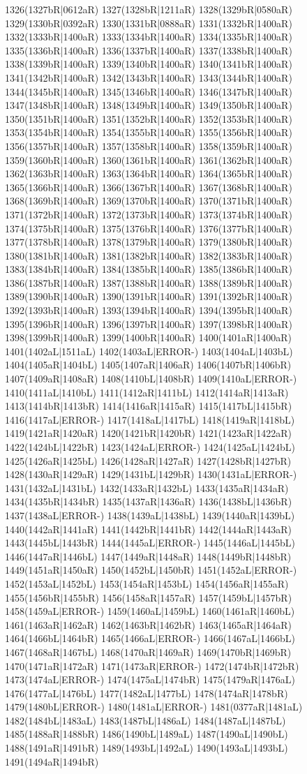 1326(1327bR|0612aR) 1327(1328bR|1211aR) 1328(1329bR|0580aR) 1329(1330bR|0392aR) 1330(1331bR|0888aR) 1331(1332bR|1400aR) 1332(1333bR|1400aR) 1333(1334bR|1400aR) 1334(1335bR|1400aR) 1335(1336bR|1400aR) 1336(1337bR|1400aR) 1337(1338bR|1400aR) 1338(1339bR|1400aR) 1339(1340bR|1400aR) 1340(1341bR|1400aR) 1341(1342bR|1400aR) 1342(1343bR|1400aR) 1343(1344bR|1400aR) 1344(1345bR|1400aR) 1345(1346bR|1400aR) 1346(1347bR|1400aR) 1347(1348bR|1400aR) 1348(1349bR|1400aR) 1349(1350bR|1400aR) 1350(1351bR|1400aR) 1351(1352bR|1400aR) 1352(1353bR|1400aR) 1353(1354bR|1400aR) 1354(1355bR|1400aR) 1355(1356bR|1400aR) 1356(1357bR|1400aR) 1357(1358bR|1400aR) 1358(1359bR|1400aR) 1359(1360bR|1400aR) 1360(1361bR|1400aR) 1361(1362bR|1400aR) 1362(1363bR|1400aR) 1363(1364bR|1400aR) 1364(1365bR|1400aR) 1365(1366bR|1400aR) 1366(1367bR|1400aR) 1367(1368bR|1400aR) 1368(1369bR|1400aR) 1369(1370bR|1400aR) 1370(1371bR|1400aR) 1371(1372bR|1400aR) 1372(1373bR|1400aR) 1373(1374bR|1400aR) 1374(1375bR|1400aR) 1375(1376bR|1400aR) 1376(1377bR|1400aR) 1377(1378bR|1400aR) 1378(1379bR|1400aR) 1379(1380bR|1400aR) 1380(1381bR|1400aR) 1381(1382bR|1400aR) 1382(1383bR|1400aR) 1383(1384bR|1400aR) 1384(1385bR|1400aR) 1385(1386bR|1400aR) 1386(1387bR|1400aR) 1387(1388bR|1400aR) 1388(1389bR|1400aR) 1389(1390bR|1400aR) 1390(1391bR|1400aR) 1391(1392bR|1400aR) 1392(1393bR|1400aR) 1393(1394bR|1400aR) 1394(1395bR|1400aR) 1395(1396bR|1400aR) 1396(1397bR|1400aR) 1397(1398bR|1400aR) 1398(1399bR|1400aR) 1399(1400bR|1400aR) 1400(1401aR|1400aR) 1401(1402aL|1511aL) 1402(1403aL|ERROR-) 1403(1404aL|1403bL) 1404(1405aR|1404bL) 1405(1407aR|1406aR) 1406(1407bR|1406bR) 1407(1409aR|1408aR) 1408(1410bL|1408bR) 1409(1410aL|ERROR-) 1410(1411aL|1410bL) 1411(1412aR|1411bL) 1412(1414aR|1413aR) 1413(1414bR|1413bR) 1414(1416aR|1415aR) 1415(1417bL|1415bR) 1416(1417aL|ERROR-) 1417(1418aL|1417bL) 1418(1419aR|1418bL) 1419(1421aR|1420aR) 1420(1421bR|1420bR) 1421(1423aR|1422aR) 1422(1424bL|1422bR) 1423(1424aL|ERROR-) 1424(1425aL|1424bL) 1425(1426aR|1425bL) 1426(1428aR|1427aR) 1427(1428bR|1427bR) 1428(1430aR|1429aR) 1429(1431bL|1429bR) 1430(1431aL|ERROR-) 1431(1432aL|1431bL) 1432(1433aR|1432bL) 1433(1435aR|1434aR) 1434(1435bR|1434bR) 1435(1437aR|1436aR) 1436(1438bL|1436bR) 1437(1438aL|ERROR-) 1438(1439aL|1438bL) 1439(1440aR|1439bL) 1440(1442aR|1441aR) 1441(1442bR|1441bR) 1442(1444aR|1443aR) 1443(1445bL|1443bR) 1444(1445aL|ERROR-) 1445(1446aL|1445bL) 1446(1447aR|1446bL) 1447(1449aR|1448aR) 1448(1449bR|1448bR) 1449(1451aR|1450aR) 1450(1452bL|1450bR) 1451(1452aL|ERROR-) 1452(1453aL|1452bL) 1453(1454aR|1453bL) 1454(1456aR|1455aR) 1455(1456bR|1455bR) 1456(1458aR|1457aR) 1457(1459bL|1457bR) 1458(1459aL|ERROR-) 1459(1460aL|1459bL) 1460(1461aR|1460bL) 1461(1463aR|1462aR) 1462(1463bR|1462bR) 1463(1465aR|1464aR) 1464(1466bL|1464bR) 1465(1466aL|ERROR-) 1466(1467aL|1466bL) 1467(1468aR|1467bL) 1468(1470aR|1469aR) 1469(1470bR|1469bR) 1470(1471aR|1472aR) 1471(1473aR|ERROR-) 1472(1474bR|1472bR) 1473(1474aL|ERROR-) 1474(1475aL|1474bR) 1475(1479aR|1476aL) 1476(1477aL|1476bL) 1477(1482aL|1477bL) 1478(1474aR|1478bR) 1479(1480bL|ERROR-) 1480(1481aL|ERROR-) 1481(0377aR|1481aL) 1482(1484bL|1483aL) 1483(1487bL|1486aL) 1484(1487aL|1487bL) 1485(1488aR|1488bR) 1486(1490bL|1489aL) 1487(1490aL|1490bL) 1488(1491aR|1491bR) 1489(1493bL|1492aL) 1490(1493aL|1493bL) 1491(1494aR|1494bR) 